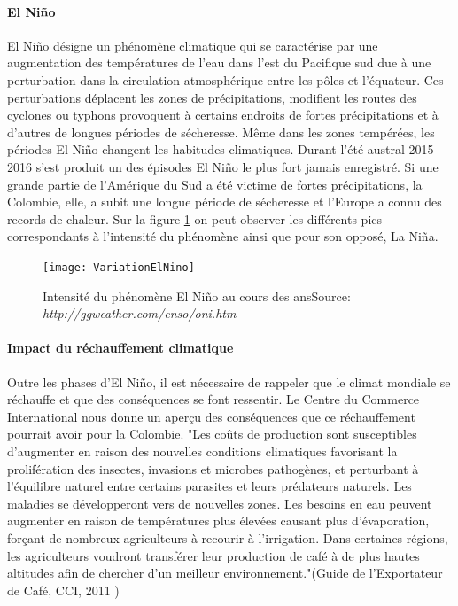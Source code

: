 \paragraph{El Niño}El Niño désigne un phénomène climatique qui se caractérise par une augmentation des températures de l'eau dans l'est du Pacifique sud due à une perturbation dans la circulation atmosphérique entre les pôles et l'équateur. Ces perturbations déplacent les zones de précipitations, modifient les routes des cyclones ou typhons provoquent à certains endroits de fortes précipitations et à d'autres de longues périodes de sécheresse. Même dans les zones tempérées, les périodes El Niño changent les habitudes climatiques. Durant l'été austral 2015-2016 s'est produit un des épisodes El Niño le plus fort jamais enregistré\cite{OMM}. Si une grande partie de l'Amérique du Sud a été victime de fortes précipitations, la Colombie, elle, a subit une longue période de sécheresse et l'Europe a connu des records de chaleur. Sur la figure \ref{Nino} on peut observer les différents pics correspondants à l'intensité du phénomène ainsi que pour son opposé, La Niña. 

\begin{figure}[H]
	\centering
	\texttt{[image: VariationElNino]}
	\caption{\label{Nino} Intensité du phénomène El Niño au cours des ans\newline Source: \textit{http://ggweather.com/enso/oni.htm}}
\end{figure}

\paragraph{Impact du réchauffement climatique} Outre les phases d'El Niño, il est nécessaire de rappeler que le climat mondiale se réchauffe et que des conséquences se font ressentir. Le Centre du Commerce International \cite{CCI} nous donne un aperçu des conséquences que ce réchauffement pourrait avoir pour la Colombie. "Les coûts de production sont susceptibles d'augmenter en raison des nouvelles conditions climatiques favorisant la prolifération des insectes, invasions et microbes pathogènes, et perturbant à l'équilibre naturel entre certains parasites et leurs prédateurs naturels. Les maladies se développeront vers de nouvelles zones. Les besoins en eau peuvent augmenter en raison de températures plus élevées causant plus d'évaporation, forçant de nombreux agriculteurs à recourir à l'irrigation. Dans certaines régions, les agriculteurs voudront transférer leur production de café à de plus hautes altitudes afin de chercher d'un meilleur environnement."(Guide de l'Exportateur de Café, CCI, 2011 \cite{GuideCafe})


